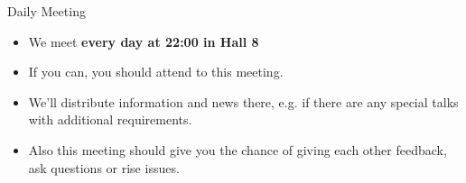 
\begin{frame}{Daily Meeting}
	\begin{itemize}
		\item We meet \textbf{every day at 22:00 in Hall 8}
		\item If you can, you should attend to this meeting.
		\item We'll distribute information and news there, e.g. if there are any special talks with additional requirements.
		\item Also this meeting should give you the chance of giving each other feedback, ask questions or rise issues.
	\end{itemize}
\end{frame}
